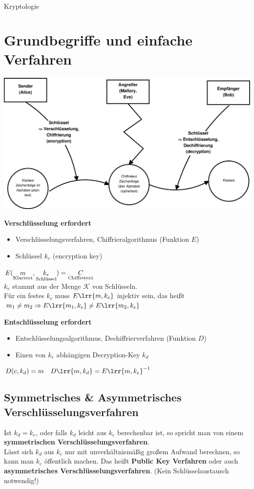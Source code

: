 \newpage
\begin{center}
	\huge{Kryptologie}
\end{center}
\section{Grundbegriffe und einfache Verfahren}

	\includegraphics[width=\textwidth]{eps/pic01.eps}

	\textbf{Verschlüsselung erfordert}
	\begin{itemize}
		\item Verschlüsselungsverfahren, Chiffrieralgorithmus (Funktion $E$)
		\item Schlüssel $k_e$ (encryption key)
	\end{itemize}
	$E(\underset{\mbox{\scriptsize Klartext}}{m},\underset{\mbox{\scriptsize Schlüssel}}{k_e})=\underset{\mbox{\scriptsize Chiffretext}}{C}$ \\
	$k_e$ stammt aus der Menge $\mathcal{K}$ von Schlüsseln.\\
	Für ein festes $k_e$ muss $E\lrr{m,k_e}$ injektiv sein, das heißt\\
	$m_1\neq m_2 \Rightarrow E\lrr{m_1,k_e}\neq E\lrr{m_2,k_e}$
	
	\textbf{Entschlüsselung erfordert}
	\begin{itemize}
		\item Entschlüsselungsalgorithmus, Dechiffrierverfahren (Funktion $D$)
		\item Einen von $k_e$ abhängigen Decryption-Key $k_d$
	\end{itemize}
	$D(c,k_d)=m\quad D\lrr{m,k_d}=E\lrr{m,k_e}^{-1}$
	
	\subsection{Symmetrisches \& Asymmetrisches Verschlüsselungsverfahren}
		Ist $k_d=k_e$, oder falls $k_d$ leicht aus $k_e$ berechenbar ist, so spricht man von einem \textbf{symmetrischen Verschlüsselungsverfahren}.\\
		Lässt sich $k_d$ aus $k_e$ nur mit unverhältnismäßig großem Aufwand berechnen, so kann man $k_e$ öffentlich machen. Das heißt \textbf{Public Key Verfahren} oder auch \textbf{asymmetrisches Verschlüsselungsverfahren}. (Kein Schlüsselaustausch notwendig!)
	
